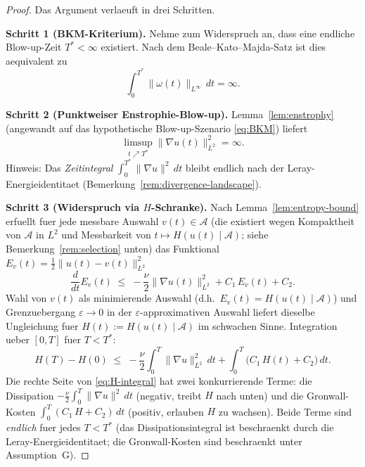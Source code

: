 \documentclass[12pt,a4paper]{article}
\theoremstyle{definition}
\theoremstyle{plain}
\theoremstyle{remark}
\begin{document}
\begin{proof}
Das Argument verlaeuft in drei Schritten.

\medskip
\noindent\textbf{Schritt 1 (BKM-Kriterium).} Nehme zum Widerspruch an, dass eine endliche
Blow-up-Zeit $T^* < \infty$ existiert. Nach dem Beale--Kato--Majda-Satz
\cite{BealeKatoMajda1984} ist dies aequivalent zu
\begin{equation}\label{eq:BKM}
    \int_0^{T^*}\|\omega(t)\|_{L^\infty}\,dt = \infty.
\end{equation}

\medskip
\noindent\textbf{Schritt 2 (Punktweiser Enstrophie-Blow-up).} Lemma~\ref{lem:enstrophy}
(angewandt auf das hypothetische Blow-up-Szenario \eqref{eq:BKM}) liefert
\begin{equation}\label{eq:diss-inf}
    \limsup_{t \nearrow T^*}\|\nabla u(t)\|_{L^2}^2 = \infty.
\end{equation}
Hinweis: Das \emph{Zeitintegral} $\int_0^{T^*}\|\nabla u\|^2\,dt$
bleibt endlich nach der Leray-Energieidentitaet
(Bemerkung~\ref{rem:divergence-landscape}).

\medskip
\noindent\textbf{Schritt 3 (Widerspruch via $H$-Schranke).}
Nach Lemma~\ref{lem:entropy-bound} erfuellt fuer jede messbare Auswahl
$v(t)\in\mathcal{A}$ (die existiert wegen Kompaktheit von $\mathcal{A}$ in $L^2$ und
Messbarkeit von $t\mapsto H(u(t)\mid\mathcal{A})$; siehe Bemerkung~\ref{rem:selection}
unten) das Funktional $E_v(t)=\tfrac12\|u(t)-v(t)\|_{L^2}^2$
\[
    \frac{d}{dt}E_v(t)
    \;\le\; -\frac{\nu}{2}\|\nabla u(t)\|_{L^2}^2 + C_1\,E_v(t) + C_2.
\]
Wahl von $v(t)$ als minimierende Auswahl (d.h.\ $E_v(t) = H(u(t)\mid\mathcal{A})$)
und Grenzuebergang $\varepsilon\to 0$ in der $\varepsilon$-approximativen Auswahl
liefert dieselbe Ungleichung fuer $H(t):=H(u(t)\mid\mathcal{A})$ im schwachen Sinne.
Integration ueber $[0,T]$ fuer $T < T^*$:
\begin{equation}\label{eq:H-integral}
    H(T) - H(0)
    \;\le\;
    -\frac{\nu}{2}\int_0^T\|\nabla u\|_{L^2}^2\,dt
    + \int_0^T\!\big(C_1\,H(t) + C_2\big)\,dt.
\end{equation}
Die rechte Seite von \eqref{eq:H-integral} hat zwei konkurrierende Terme:
die Dissipation $-\tfrac{\nu}{2}\int_0^T\|\nabla u\|^2\,dt$
(negativ, treibt $H$ nach unten) und die Gronwall-Kosten
$\int_0^T(C_1\,H + C_2)\,dt$ (positiv, erlauben $H$ zu wachsen).
Beide Terme sind \emph{endlich} fuer jedes $T < T^*$ (das Dissipationsintegral
ist beschraenkt durch die Leray-Energieidentitaet; die Gronwall-Kosten
sind beschraenkt unter Assumption~G).


\end{proof}
\end{document}
